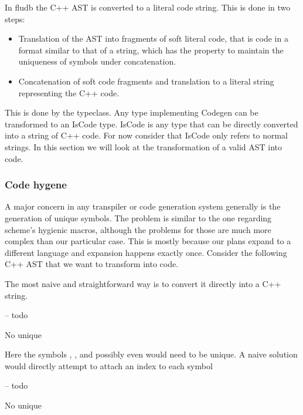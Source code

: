 In fludb the C++ AST is converted to a literal code string. This is
done in two steps:

\begin{itemize}
\item Translation of the AST into fragments of soft literal code, that
is code in a format similar to that of a string, which has the
property to maintain the uniqueness of symbols under concatenation.
\item Concatenation of soft code fragments and translation to a literal
string representing the C++ code.
\end{itemize}

This is done by the  typeclass. Any type implementing
Codegen can be transformed to an IsCode type. IsCode is any type that
can be directly converted into a string of C++ code. For now consider
that IsCode only refers to normal strings. In this section we will
look at the transformation of a valid AST into code.

\subsubsection{Code hygene}

A major concern in any transpiler or code generation system generally
is the generation of unique symbols. The problem is similar to the one
regarding scheme’s hygienic macros, although the problems for those
are much more complex than our particular case. This is mostly because
our plans expand to a different language and expansion happens exactly
once. Consider the following C++ AST that we want to transform into
code.


The most naive and straightforward way is to convert it directly into
a C++ string.

\begin{code}
\begin{haskellcode}
-- todo
\end{haskellcode}
\caption{No unique}
\end{code}

Here the symbols , , and possibly even  would
need to be unique. A naive solution would directly attempt to attach
an index to each symbol

\begin{code}
\begin{haskellcode}
-- todo
\end{haskellcode}
\caption{No unique}
\end{code}

